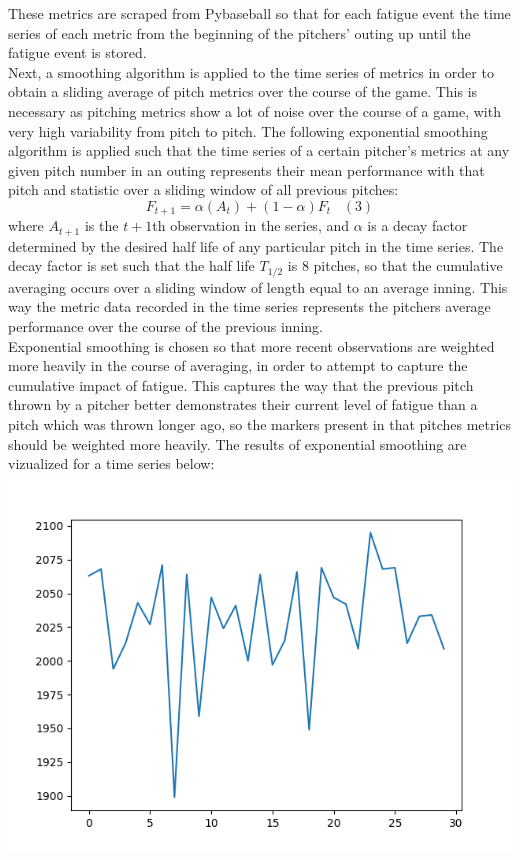 \documentclass[12 pt]{article}
\begin{document}
These metrics are scraped from Pybaseball so that for each fatigue event the time series of 
each metric from the beginning of the pitchers' outing up until the fatigue event is stored.
\\ \indent Next, a smoothing algorithm is applied to the time series of metrics in order to obtain 
a sliding average of pitch metrics over the course of the game. This is necessary as pitching metrics 
show a lot of noise over the course of a game, with very high variability from pitch 
to pitch. The following exponential smoothing algorithm is applied such that the time series 
of a certain pitcher's metrics at any given pitch number in an outing represents their mean 
performance with that pitch and statistic over a sliding window of all previous pitches:
\[F_{t+1} = \alpha(A_t) + (1-\alpha)F_t\;\;\;(3)\]
where $A_{t+1}$ is the $t+1$th observation in the series, and $\alpha$ is a decay factor determined by the desired half life of any particular pitch 
in the time series. The decay factor is set such that the half life $T_{1/2}$ is 8 pitches, so that the 
cumulative averaging occurs over a sliding window of length equal to an average inning. 
This way the metric data recorded in the time series represents the pitchers average performance over 
the course of the previous inning.
\\ \indent Exponential smoothing is chosen so that more recent observations are weighted more 
heavily in the course of averaging, in order to attempt to capture the cumulative impact of 
fatigue. This captures the way that the previous pitch thrown by a pitcher better demonstrates their 
current level of fatigue than a pitch which was thrown longer ago, so the markers present in that 
pitches metrics should be weighted more heavily. The results of exponential smoothing 
are vizualized for a time series below: \\
\includegraphics[scale = .5]{figs/unsmoothed.png}
\end{document}
